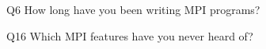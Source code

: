 \begin{description}%
\item{Q6} How long have you been writing MPI programs?%
\item{Q16} Which MPI features have you never heard of?%
\end{description}%
